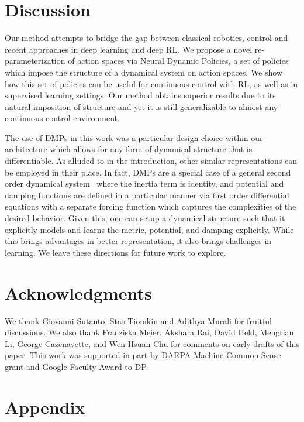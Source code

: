 \documentclass{article}
\begin{document}
\section{Discussion}
Our method attempts to bridge the gap between classical robotics, control and recent approaches in deep learning and deep RL. We propose a novel re-parameterization of action spaces via Neural Dynamic Policies, a set of policies which impose the structure of a dynamical system on action spaces. We show how this set of policies can be useful for continuous control with RL, as well as in supervised learning settings. Our method obtains superior results due to its natural imposition of structure and yet it is still generalizable to almost any continuous control environment.

The use of DMPs in this work was a particular design choice within our architecture which allows for any form of dynamical structure that is differentiable. As alluded to in the introduction, other similar representations can be employed in their place. In fact, DMPs are a special case of a general second order dynamical system~\cite{bullo2005geometric,ratliff2018riemannian} where the inertia term is identity, and potential and damping functions are defined in a particular manner via first order differential equations with a separate forcing function which captures the complexities of the desired behavior. Given this, one can setup a dynamical structure such that it explicitly models and learns the metric, potential, and damping explicitly. While this brings advantages in better representation, it also brings challenges in learning. We leave these directions for future work to explore.

\section*{Acknowledgments}
We thank Giovanni Sutanto, Stas Tiomkin and Adithya Murali for fruitful discussions. We also thank Franziska Meier, Akshara Rai, David Held, Mengtian Li, George Cazenavette, and Wen-Hsuan Chu for comments on early drafts of this paper. This work was supported in part by DARPA Machine Common Sense grant and Google Faculty Award to DP.




\clearpage

\appendix
\section{Appendix}
\end{document}
